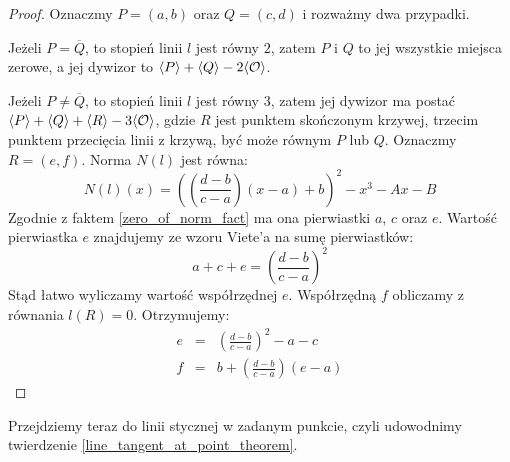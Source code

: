 \begin{proof}
Oznaczmy $P = (a, b)$ oraz $Q = (c, d)$
i rozważmy dwa przypadki.

Jeżeli $P = \overline{Q}$,
to stopień linii $l$ jest równy $2$,
zatem $P$ i $Q$ to jej wszystkie miejsca zerowe,
a jej dywizor to $\langle P\rangle + \langle Q\rangle - 2\langle\mathcal{O}\rangle$.

Jeżeli $P \neq \overline{Q}$,
to stopień linii $l$ jest równy $3$,
zatem jej dywizor ma postać
$\langle P\rangle + \langle Q\rangle + \langle R\rangle - 3\langle\mathcal{O}\rangle$,
gdzie $R$ jest punktem skończonym krzywej,
trzecim punktem przecięcia linii z krzywą,
być może równym $P$ lub $Q$.
Oznaczmy $R = (e, f)$.
Norma $N(l)$ jest równa:
\begin{equation*}
N(l)(x) =
\left(\left(\frac{d-b}{c-a}\right)(x-a) + b\right)^2 - x^3 - Ax - B
\end{equation*}
Zgodnie z faktem \ref{zero_of_norm_fact}
ma ona pierwiastki $a$, $c$ oraz $e$.
Wartość pierwiastka $e$ znajdujemy ze wzoru Viete'a na sumę pierwiastków:
\begin{equation*}
a + c + e = \left(\frac{d-b}{c-a}\right)^2
\end{equation*}
Stąd łatwo wyliczamy wartość współrzędnej $e$.
Współrzędną $f$ obliczamy z równania $l(R) = 0$.
Otrzymujemy:
\begin{eqnarray}
\label{chord_line_third_point_x_eqn}
e & = & \left(\frac{d-b}{c-a}\right)^2 - a - c \\
\label{chord_line_third_point_y_eqn}
f & = & b + \left(\frac{d-b}{c-a}\right)(e-a)
\end{eqnarray}
\end{proof}

Przejdziemy teraz do linii stycznej w zadanym punkcie,
czyli udowodnimy twierdzenie \ref{line_tangent_at_point_theorem}.

